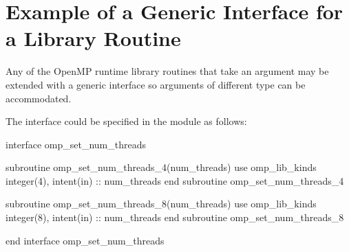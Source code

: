 \section{Example of a Generic Interface for a Library Routine}
\label{sec:Example of a Generic Interface for a Library Routine}
Any of the OpenMP runtime library routines that take an argument may be extended 
with a generic interface so arguments of different  type can be accommodated.

The  interface could be specified in the  module 
as follows:

\begin{boxedcode}
interface omp\_set\_num\_threads

    subroutine omp\_set\_num\_threads_4(num\_threads)
      use omp\_lib\_kinds
      integer(4), intent(in) :: num\_threads
    end subroutine omp\_set\_num\_threads_4

    subroutine omp\_set\_num\_threads_8(num\_threads)
      use omp\_lib\_kinds
      integer(8), intent(in) :: num\_threads
    end subroutine omp\_set\_num\_threads_8

end interface omp\_set\_num\_threads
\end{boxedcode}



